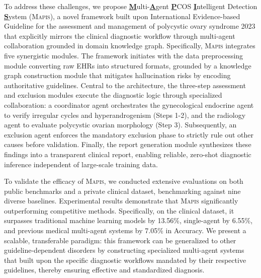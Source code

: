 \documentclass[a4paper,fleqn]{cas-dc}
\begin{document}
To address these challenges, we propose \underline{\textbf{M}}ulti-\underline{\textbf{A}}gent \underline{\textbf{P}}COS \underline{\textbf{I}}ntelligent Detection \underline{\textbf{S}}ystem (\textsc{Mapis}), a novel framework built upon International Evidence-based Guideline for the assessment and management of polycystic ovary syndrome 2023 \cite{teede2023international} that explicitly mirrors the clinical diagnostic workflow through multi-agent collaboration grounded in domain knowledge graph. Specifically, \textsc{Mapis} integrates five synergistic modules. The framework initiates with the data preprocessing module converting raw EHRs into structured formats, grounded by a knowledge graph construction module that mitigates hallucination risks by encoding authoritative guidelines. Central to the architecture, the three-step assessment and exclusion modules execute the diagnostic logic through specialized collaboration: a coordinator agent orchestrates the gynecological endocrine agent to verify irregular cycles and hyperandrogenism (Steps 1-2), and the radiology agent to evaluate polycystic ovarian morphology (Step 3). Subsequently, an exclusion agent enforces the mandatory exclusion phase to strictly rule out other causes before validation. Finally, the report generation module synthesizes these findings into a transparent clinical report, enabling reliable, zero-shot diagnostic inference independent of large-scale training data. 

To validate the efficacy of \textsc{Mapis}, we conducted extensive evaluations on both public benchmarks and a private clinical dataset, benchmarking against nine diverse baselines. Experimental results demonstrate that \textsc{Mapis} significantly outperforming competitive methods. Specifically, on the clinical dataset, it surpasses traditional machine learning models by 13.56\%, single-agent by 6.55\%, and previous medical multi-agent systems by 7.05\% in Accuracy. We present a scalable, transferable paradigm: this framework can be generalized to other guideline-dependent disorders by constructing specialized multi-agent systems that built upon the specific diagnostic workflows mandated by their respective guidelines, thereby ensuring effective and standardized diagnosis.
\end{document}
